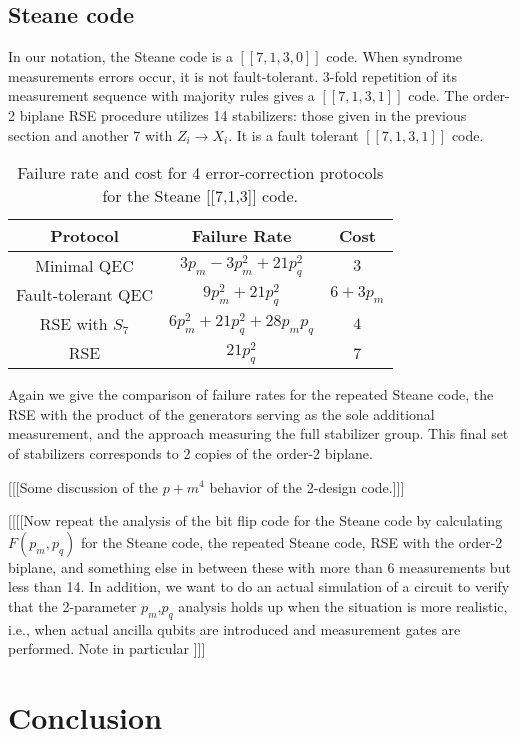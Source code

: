 \documentclass[reprint, superscriptaddress]{revtex4-1}
\numberwithin{equation}{section}
\numberwithin{figure}{section}
\numberwithin{table}{section}
\begin{document}
\subsection{Steane code}

In our notation, the Steane code is a $[[7,1,3,0]]$ code.  When syndrome measurements errors occur, it is not fault-tolerant.  3-fold repetition of its measurement sequence with majority rules gives a $[[7,1,3,1]]$ code.  The order-2 biplane RSE procedure utilizes 14 stabilizers: those given in the previous section and another 7 with $Z_i \rightarrow X_i$.  It is a fault tolerant $[[7,1,3,1]]$ code. 
\begin{table}[h]
\begin{tabular} {c|c|c}

Protocol & Failure Rate & Cost \\
\hline\hline
Minimal QEC & $3p_m - 3p_m^2 + 21p_q^2$  &  $3$ \\
Fault-tolerant QEC  & $9 p_m^2 + 21 p_q^2$  &  $6 + 3 p_m$  \\

RSE with $S_7$ & $6p_m^2 + 21p_q^2 + 28 p_m p_q$ & $4$ \\

RSE  &  $21 p_q^2$  &  7\\

\end{tabular}
	\caption {Failure rate and cost for 4 error-correction protocols 
	for the Steane [[7,1,3]] code.}
\end{table}
Again we give the comparison of failure rates for the repeated Steane code, the RSE with the product of the generators serving as the sole additional measurement, and the approach measuring the full stabilizer group. This final set of stabilizers corresponds to 2 copies of the order-2 biplane.     

[[[Some discussion of the $p+m^4$ behavior of the 2-design code.]]]


[[[[Now repeat the analysis of the bit flip code for the Steane code by calculating $F(p_m,p_q)$ for the Steane code, the repeated Steane code, RSE with the order-2 biplane, and something else in between these with more than 6 measurements but less than 14.  In addition, we want to do an actual simulation  of a circuit to verify that the 2-parameter $p_m$,$p_q$ analysis holds up when the situation is more realistic, i.e., when actual ancilla qubits are introduced and measurement gates are performed.  Note in particular  ]]]

\section{Conclusion}
\end{document}
